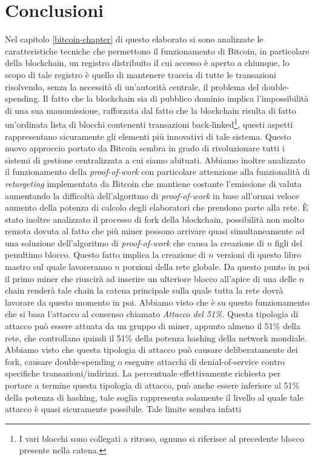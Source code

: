
\cleardoublepage
{}

\chapter*{Conclusioni}
Nel capitolo \ref{bitcoin-chapter} di questo elaborato si sono analizzate le caratteristiche tecniche che permettono il funzionamento di Bitcoin, in particolare della blockchain, un registro distribuito il cui accesso è aperto a chiunque, lo scopo di tale registro è quello di mantenere traccia di tutte le transazioni risolvendo, senza la necessità di un’autorità centrale, il problema del double-spending. Il fatto che la blockchain sia di pubblico dominio implica l’impossibilità di una sua manomissione, rafforzata dal fatto che la blockchain risulta di fatto un'ordinata lista di blocchi contenenti transazioni back-linked\footnote{I vari blocchi sono collegati a ritroso, ognuno si riferisce al precedente blocco presente nella catena.}, questi aspetti rappresentano sicuramente gli elementi più innovativi di tale sistema. Questo nuovo approccio portato da Bitcoin sembra in grado di rivoluzionare tutti i sistemi di gestione centralizzata a cui siamo abituati. Abbiamo inoltre analizzato il funzionamento della \textit{proof-of-work} con particolare attenzione alla funzionalità di \textit{retargeting} implementata da Bitcoin che mantiene costante l'emissione di valuta aumentando la difficoltà dell'algoritmo di \textit{proof-of-work} in base all'ormai veloce aumento della potenza di calcolo degli elaboratori che prendono parte alla rete. \`E stato inoltre analizzato il processo di fork della blockchain, possibilità non molto remota dovuta al fatto che più miner possono arrivare quasi simultaneamente ad una soluzione dell'algoritmo di \textit{proof-of-work} che causa la creazione di $n$ figli del penultimo blocco. Questo fatto implica la creazione di $n$ versioni di questo libro mastro sul quale lavoreranno $n$ porzioni della rete globale. Da questo punto in poi il primo miner che riuscirà ad inserire un ulteriore blocco all'apice di una delle $n$ chain renderà tale chain la catena principale sulla quale tutta la rete dovrà lavorare da questo momento in poi. Abbiamo visto che è su questo funzionamento che si basa l'attacco al consenso chiamato \textit{Attacco del 51\%}. Questa tipologia di attacco può essere attuata da un gruppo di miner, appunto almeno il 51\% della rete, che controllano quindi il 51\% della potenza hashing della network mondiale. Abbiamo visto che questa tipologia di attacco può causare deliberatamente dei fork, causare double-spending o eseguire attacchi di denial-of-service contro specifiche transazioni/indirizzi. La percentuale effettivamente richiesta per portare a termine questa tipologia di attacco, può anche essere inferiore al 51\% della potenza di hashing, tale soglia rappresenta solamente il livello al quale tale attacco è quasi sicuramente possibile. Tale limite sembra infatti 